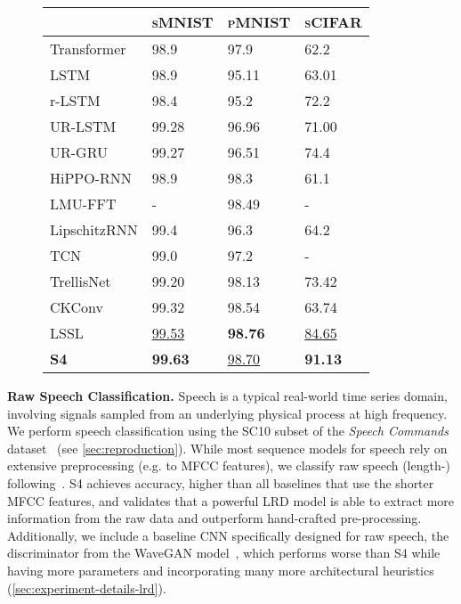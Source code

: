 \documentclass{article}
\newcommand{\methodabbrv}{S4}
\begin{document}
\begin{figure}[b!]
\begin{minipage}[t]{0.47\linewidth}
{  }
  \begin{tabular}{@{}llll@{}}
    \toprule
                     & \textsc{sMNIST} & \textsc{pMNIST}   & \textsc{sCIFAR}   \\
    \midrule
    Transformer      & 98.9            & 97.9              & 62.2              \\
    \midrule
    LSTM             & 98.9            & 95.11             & 63.01             \\
    r-LSTM           & 98.4            & 95.2              & 72.2              \\
    UR-LSTM          & 99.28           & 96.96             & 71.00             \\
    UR-GRU           & 99.27           & 96.51             & 74.4              \\
    HiPPO-RNN        & 98.9            & 98.3              & 61.1              \\
    LMU-FFT          & -               & 98.49             & -                 \\
    LipschitzRNN     & 99.4            & 96.3              & 64.2              \\
    \midrule
    TCN              & 99.0            & 97.2              & -                 \\
    TrellisNet       & 99.20           & 98.13             & 73.42             \\
    CKConv           & 99.32           & 98.54             & 63.74             \\
    \midrule
    LSSL & \underline{99.53}           & \textbf{98.76}    & \underline{84.65} \\
    \textbf{\methodabbrv}      & \textbf{99.63}  & \underline{98.70} & \textbf{91.13}    \\
    \bottomrule
  \end{tabular}
  \label{tab:image}
\end{minipage}
\end{figure}

\textbf{Raw Speech Classification.}
Speech is a typical real-world time series domain, involving signals sampled from an underlying physical process at high frequency.
We perform speech classification using the SC10 subset of the \emph{Speech Commands} dataset~\citep{Warden2018SpeechCA} (see \cref{sec:reproduction}).
While most sequence models for speech rely on extensive preprocessing (e.g. to MFCC features), we classify raw speech (length-) following~\citet{romero2021ckconv}.
\methodabbrv{} achieves  accuracy, higher than all baselines that use the  shorter MFCC features, and validates that a powerful LRD model is able to extract more information from the raw data and outperform hand-crafted pre-processing.
Additionally, we include a baseline CNN specifically designed for raw speech, the discriminator from the WaveGAN model~\citep{Donahue2019AdversarialAS},
which performs worse than \methodabbrv{} while having  more parameters and incorporating many more
architectural heuristics (\cref{sec:experiment-details-lrd}).
\end{document}
